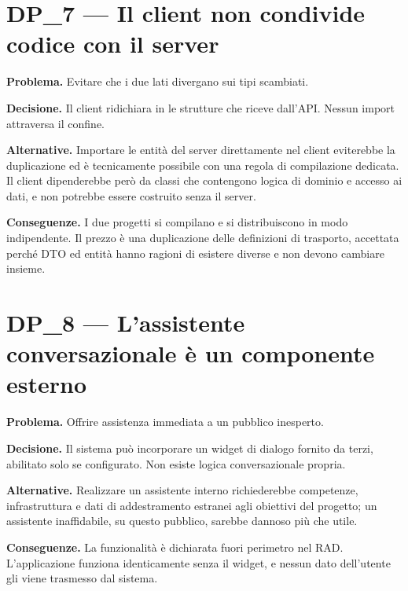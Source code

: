 \section{DP\_7 — Il client non condivide codice con il server}

\textbf{Problema.} Evitare che i due lati divergano sui tipi scambiati.

\textbf{Decisione.} Il client ridichiara in  le strutture che
riceve dall'API. Nessun import attraversa il confine.

\textbf{Alternative.} Importare le entità del server direttamente nel client
eviterebbe la duplicazione ed è tecnicamente possibile con una regola di
compilazione dedicata. Il client dipenderebbe però da classi che contengono
logica di dominio e accesso ai dati, e non potrebbe essere costruito senza il
server.

\textbf{Conseguenze.} I due progetti si compilano e si distribuiscono in modo
indipendente. Il prezzo è una duplicazione delle definizioni di trasporto,
accettata perché DTO ed entità hanno ragioni di esistere diverse e non devono
cambiare insieme.

\section{DP\_8 — L'assistente conversazionale è un componente esterno}

\textbf{Problema.} Offrire assistenza immediata a un pubblico inesperto.

\textbf{Decisione.} Il sistema può incorporare un widget di dialogo fornito
da terzi, abilitato solo se configurato. Non esiste logica conversazionale
propria.

\textbf{Alternative.} Realizzare un assistente interno richiederebbe
competenze, infrastruttura e dati di addestramento estranei agli obiettivi
del progetto; un assistente inaffidabile, su questo pubblico, sarebbe
dannoso più che utile.

\textbf{Conseguenze.} La funzionalità è dichiarata fuori perimetro nel RAD.
L'applicazione funziona identicamente senza il widget, e nessun dato
dell'utente gli viene trasmesso dal sistema.
